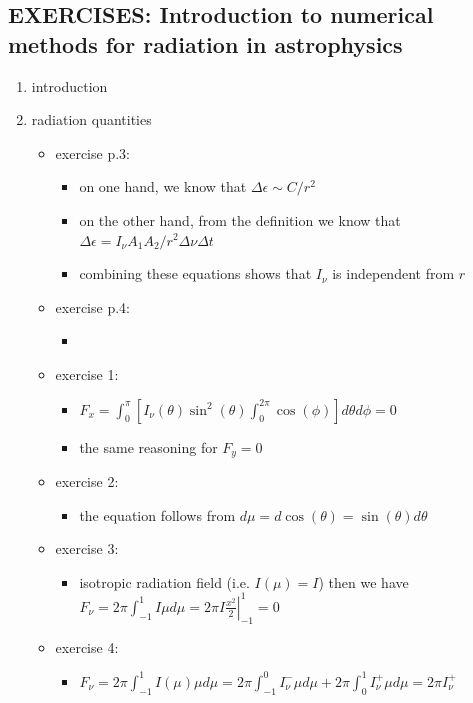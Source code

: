 \documentclass[10pt,a4paper]{article}
\begin{document}
\subsection{EXERCISES: Introduction to numerical methods for radiation in astrophysics}
\begin{enumerate}
\item introduction
\item radiation quantities
\begin{itemize}

\item exercise p.3: 
\begin{itemize}
\item on one hand, we know that $\Delta \epsilon \sim C/r^2 $
\item on the other hand, from the definition we know  that $\Delta \epsilon = I_{\nu} A_1 A_2/r^2 \Delta \nu \Delta t$
\item combining these equations shows that $I_{\nu}$ is independent from $r$
\end{itemize}

\item exercise p.4:
\begin{itemize}
\item 
\end{itemize}

\item exercise 1:
\begin{itemize}
\item $F_x =  \int_0^{\pi} \left[ I_{\nu}(\theta)\sin^2(\theta) \int_0^{2 \pi}\cos(\phi) \right] d\theta d \phi = 0 $
\item the same reasoning for $F_y = 0$
\end{itemize}

\item exercise 2:
\begin{itemize}
\item the equation follows from $d\mu = d\cos(\theta) = \sin(\theta) d\theta$
\end{itemize}

\item exercise 3: 
\begin{itemize}
\item isotropic radiation field (i.e. $I(\mu) = I$) then we have $F_{\nu} = 2 \pi  \int_{-1}^{1} I \mu d\mu = 2 \pi I \left. \frac{x^2}{2}\right \rvert_
{-1}^{1} = 0$
\end{itemize}

\item exercise 4:
\begin{itemize}
\item $F_{\nu} = 2 \pi  \int_{-1}^{1} I(\mu) \mu d\mu 
	= 2 \pi  \int_{-1}^{0} I_{\nu}^{-} \mu d\mu 
	+ 2 \pi  \int_{0}^{1} I_{\nu}^{+} \mu d\mu 
	= 2 \pi I_{\nu}^+ $
\end{itemize}


\end{itemize}
\end{enumerate}
\end{document}
